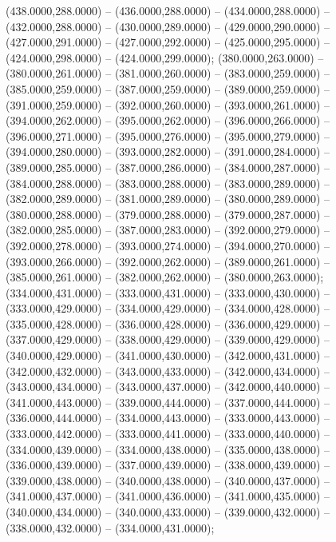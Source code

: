 \begin{scope}[shift={(-231.87,-121.87)}]
\begin{scope}[draw=black,fill=cd7191c,line join=round,line width=0.208pt]
        (438.0000,288.0000) -- (436.0000,288.0000) -- (434.0000,288.0000) --
        (432.0000,288.0000) -- (430.0000,289.0000) -- (429.0000,290.0000) --
        (427.0000,291.0000) -- (427.0000,292.0000) -- (425.0000,295.0000) --
        (424.0000,298.0000) -- (424.0000,299.0000);
       (380.0000,263.0000) -- (380.0000,261.0000) --
        (381.0000,260.0000) -- (383.0000,259.0000) -- (385.0000,259.0000) --
        (387.0000,259.0000) -- (389.0000,259.0000) -- (391.0000,259.0000) --
        (392.0000,260.0000) -- (393.0000,261.0000) -- (394.0000,262.0000) --
        (395.0000,262.0000) -- (396.0000,266.0000) -- (396.0000,271.0000) --
        (395.0000,276.0000) -- (395.0000,279.0000) -- (394.0000,280.0000) --
        (393.0000,282.0000) -- (391.0000,284.0000) -- (389.0000,285.0000) --
        (387.0000,286.0000) -- (384.0000,287.0000) -- (384.0000,288.0000) --
        (383.0000,288.0000) -- (383.0000,289.0000) -- (382.0000,289.0000) --
        (381.0000,289.0000) -- (380.0000,289.0000) -- (380.0000,288.0000) --
        (379.0000,288.0000) -- (379.0000,287.0000) -- (382.0000,285.0000) --
        (387.0000,283.0000) -- (392.0000,279.0000) -- (392.0000,278.0000) --
        (393.0000,274.0000) -- (394.0000,270.0000) -- (393.0000,266.0000) --
        (392.0000,262.0000) -- (389.0000,261.0000) -- (385.0000,261.0000) --
        (382.0000,262.0000) -- (380.0000,263.0000);
       (334.0000,431.0000) -- (333.0000,431.0000) --
        (333.0000,430.0000) -- (333.0000,429.0000) -- (334.0000,429.0000) --
        (334.0000,428.0000) -- (335.0000,428.0000) -- (336.0000,428.0000) --
        (336.0000,429.0000) -- (337.0000,429.0000) -- (338.0000,429.0000) --
        (339.0000,429.0000) -- (340.0000,429.0000) -- (341.0000,430.0000) --
        (342.0000,431.0000) -- (342.0000,432.0000) -- (343.0000,433.0000) --
        (342.0000,434.0000) -- (343.0000,434.0000) -- (343.0000,437.0000) --
        (342.0000,440.0000) -- (341.0000,443.0000) -- (339.0000,444.0000) --
        (337.0000,444.0000) -- (336.0000,444.0000) -- (334.0000,443.0000) --
        (333.0000,443.0000) -- (333.0000,442.0000) -- (333.0000,441.0000) --
        (333.0000,440.0000) -- (334.0000,439.0000) -- (334.0000,438.0000) --
        (335.0000,438.0000) -- (336.0000,439.0000) -- (337.0000,439.0000) --
        (338.0000,439.0000) -- (339.0000,438.0000) -- (340.0000,438.0000) --
        (340.0000,437.0000) -- (341.0000,437.0000) -- (341.0000,436.0000) --
        (341.0000,435.0000) -- (340.0000,434.0000) -- (340.0000,433.0000) --
        (339.0000,432.0000) -- (338.0000,432.0000) -- (334.0000,431.0000);

\end{scope}
\end{scope}
